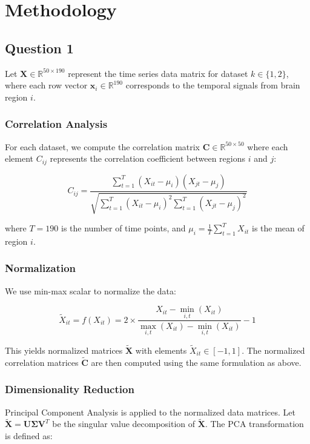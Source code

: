 \documentclass[12pt]{article}
\begin{document}
\section{Methodology}

\subsection{Question 1}
Let $\mathbf{X} \in \mathbb{R}^{50 \times 190}$ represent the time series data matrix for dataset $k \in \{1,2\}$, where each row vector $\mathbf{x}_i \in \mathbb{R}^{190}$ corresponds to the temporal signals from brain region $i$.

\subsubsection{Correlation Analysis}
For each dataset, we compute the correlation matrix $\mathbf{C} \in \mathbb{R}^{50 \times 50}$ where each element $C_{ij}$ represents the correlation coefficient between regions $i$ and $j$:

\begin{equation}
    C_{ij} = \frac{\sum_{t=1}^{T} (X_{it} - \mu_i)(X_{jt} - \mu_j)}{\sqrt{\sum_{t=1}^{T} (X_{it} - \mu_i)^2 \sum_{t=1}^{T} (X_{jt} - \mu_j)^2}}
\end{equation}

where $T = 190$ is the number of time points, and $\mu_i = \frac{1}{T}\sum_{t=1}^{T} X_{it}$ is the mean of region $i$.

\subsubsection{Normalization}
We use min-max scalar to normalize the data: 

\begin{equation}
    \tilde{X}_{it} = f(X_{it}) = 2 \times \frac{X_{it} - \min_{i,t}(X_{it})}{\max_{i,t}(X_{it}) - \min_{i,t}(X_{it})} - 1
\end{equation}

This yields normalized matrices $\tilde{\mathbf{X}}$ with elements $\tilde{X}_{it} \in [-1,1]$. The normalized correlation matrices $\tilde{\mathbf{C}}$ are then computed using the same formulation as above.

\subsubsection{Dimensionality Reduction}
Principal Component Analysis is applied to the normalized data matrices. Let $\tilde{\mathbf{X}} = \mathbf{U}\mathbf{\Sigma}{\mathbf{V}}^T$ be the singular value decomposition of $\tilde{\mathbf{X}}$. The PCA transformation is defined as:
\end{document}
